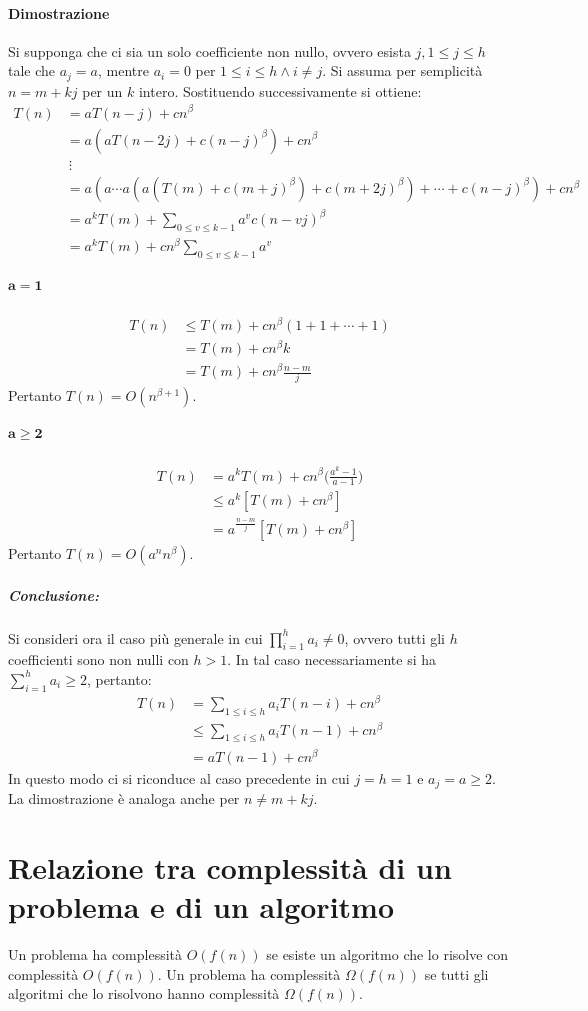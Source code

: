 \paragraph{Dimostrazione}
Si supponga che ci sia un solo coefficiente non nullo, ovvero esista $j, 1\le j\le h$ tale che $a_j = a$, mentre $a_i = 0$ per $1\le i \le h \land i\neq j$. Si assuma per semplicit\`a
$n = m + kj$ per un $k$ intero. Sostituendo successivamente si ottiene: 
\begin{align*}
	T(n) &= aT(n-j) + cn^\beta \\
	     &= a(aT(n-2j)+c(n-j)^\beta)+cn^\beta\\
	     &\ \vdots\\
	     &= a(a\cdots a(a(T(m)+c(m+j)^\beta)+c(m+2j)^\beta)+\cdots+c(n-j)^\beta)+cn^\beta\\
	     &= a^kT(m) + \sum\limits_{0\le v\le k-1} a^vc(n-vj)^\beta\\
	     &= a^kT(m)+cn^\beta\sum\limits_{0\le v \le k-1} a^v
\end{align*}
\subparagraph{$\mathbf{a = 1}$}
\begin{align*}
	T(n) &\le T(m) + cn^\beta(1+1+\cdots+1)\\
	     &= T(m) + cn^\beta k\\
	     &= T(m) + cn^\beta\frac{n-m}{j}
\end{align*}
Pertanto $T(n)=O(n^{\beta+1})$.
\subparagraph{$\mathbf{a\ge 2}$}
\begin{align*}
	T(n) &= a^kT(m)+cn^\beta\biggl(\frac{a^k-1}{a-1}\biggr)\\
	     &\le a^k[T(m)+cn^\beta]\\
	     &= a^{\frac{n-m}{j}}[T(m)+cn^\beta]
\end{align*}
Pertanto $T(n) = O(a^nn^\beta)$.
\subparagraph{Conclusione:} Si consideri ora il caso pi\`u generale in cui $\prod\limits_{i =1}^h a_i \neq0$, ovvero tutti gli $h$ coefficienti sono non nulli con $h>1$. In tal caso
necessariamente si ha $\sum\limits_{i =1}^h a_i \ge 2$, pertanto:
\begin{align*}
	T(n) &= \sum\limits_{1\le i\le h} a_iT(n-i)+cn^\beta\\
	     &\le \sum\limits_{1\le i \le h} a_iT(n-1) + cn^\beta\\
	     &= aT(n-1) + cn^\beta
\end{align*}
In questo modo ci si riconduce al caso precedente in cui $j = h = 1$ e $a_j = a\ge 2$. La dimostrazione \`e analoga anche per $n\neq m+kj$.
\section{Relazione tra complessit\`a di un problema e di un algoritmo}
Un problema ha complessit\`a $O(f(n))$ se esiste un algoritmo che lo risolve con complessit\`a $O(f(n))$. Un problema ha complessit\`a $\Omega(f(n))$ se
tutti gli algoritmi che lo risolvono hanno complessit\`a $\Omega(f(n))$.
